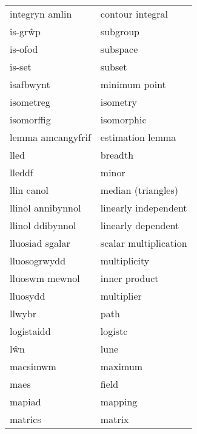\begin{supertabular}{p{0.22\textwidth}p{0.22\textwidth}}
                  integryn amlin &                  contour integral \\
                         is-grŵp &                          subgroup \\
                         is-ofod &                          subspace \\
                          is-set &                            subset \\
                       isafbwynt &                     minimum point \\
                       isometreg &                          isometry \\
                      isomorffig &                        isomorphic \\
               lemma amcangyfrif &                  estimation lemma \\
                            lled &                           breadth \\
                          lleddf &                             minor \\
                      llin canol &                median (triangles) \\
               llinol annibynnol &              linearly independent \\
                llinol ddibynnol &                linearly dependent \\
                 lluosiad sgalar &             scalar multiplication \\
                    lluosogrwydd &                      multiplicity \\
                  lluoswm mewnol &                     inner product \\
                        lluosydd &                        multiplier \\
                          llwybr &                              path \\
                      logistaidd &                           logistc \\
                             lŵn &                              lune \\
                        macsimwm &                           maximum \\
                            maes &                             field \\
                          mapiad &                           mapping \\
                         matrics &                            matrix \\

\end{supertabular}
